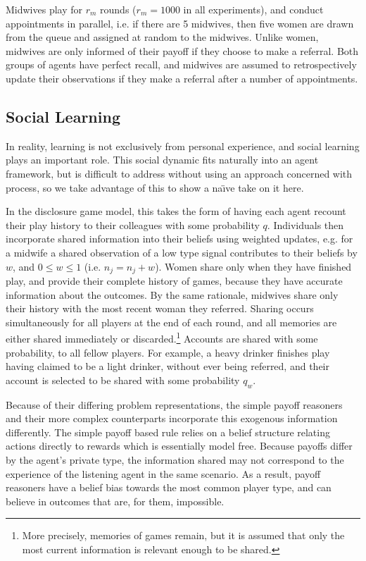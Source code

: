 \documentclass[graybox]{svmult}
\begin{document}
Midwives play for \(r_{m}\) rounds (\(r_{m}=1000\) in all experiments), and conduct appointments in parallel, i.e. if there are 5 midwives, then five women are drawn from the queue and assigned at random to the midwives. 
Unlike women, midwives are only informed of their payoff if they choose to make a referral. Both groups of agents have perfect recall, and midwives are assumed to retrospectively update their observations if they make a referral after a number of appointments.


\subsection{Social Learning}
\label{sub:info_sharing}

In reality, learning is not exclusively from personal experience, and social learning plays an important role. This social dynamic fits naturally into an agent framework, but is difficult to address without using an approach concerned with process, so we take advantage of this to show a na{\"\i}ve take on it here.

In the disclosure game model, this takes the form of having each agent recount their play history to their colleagues with some probability \(q\). Individuals then incorporate shared information into their beliefs using weighted updates, e.g. for a midwife a shared observation of a low type signal contributes to their beliefs by \(w\), and \(0\leq w\leq 1\) (i.e. \(n_{j} = n_{j} + w\)).
Women share only when they have finished play, and provide their complete history of games, because they have accurate information about the outcomes. By the same rationale, midwives share only their history with the most recent woman they referred. Sharing occurs simultaneously for all players at the end of each round, and all memories are either shared immediately or discarded.\footnote{More precisely, memories of games remain, but it is assumed that only the most current information is relevant enough to be shared.} Accounts are shared with some probability, to all fellow players. For example, a heavy drinker finishes play having claimed to be a light drinker, without ever being referred, and their account is selected to be shared with some probability $q_{w}$. 

Because of their differing problem representations, the simple payoff reasoners and their more complex counterparts incorporate this exogenous information differently. The simple payoff based rule relies on a belief structure relating actions directly to rewards which is essentially model free. Because payoffs differ by the agent's private type, the information shared may not correspond to the experience of the listening agent in the same scenario. As a result, payoff reasoners have a belief bias towards the most common player type, and can believe in outcomes that are, for them, impossible.
\end{document}
